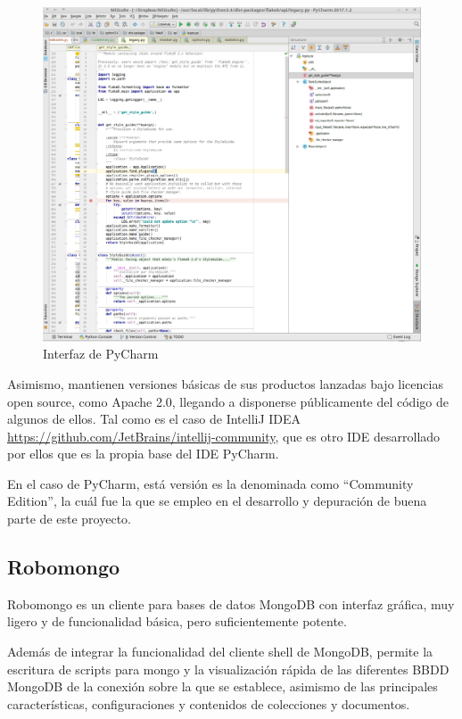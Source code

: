 \begin{figure}[H]
   \centering
   \includegraphics[width=16cm]{img/pycharm}
   \caption{Interfaz de PyCharm }
   \label{figura:pycharm}
\end{figure}



Asimismo, mantienen versiones básicas de sus productos lanzadas bajo licencias open source, como Apache 2.0, llegando a disponerse públicamente del código de algunos de ellos. Tal como es el caso de IntelliJ IDEA \space \url{https://github.com/JetBrains/intellij-community}, que es otro IDE desarrollado por ellos que es la propia base del IDE PyCharm.


En el caso de PyCharm, está versión es la denominada como ``Community Edition'', la cuál fue la que se empleo en el desarrollo y depuración de buena parte de este proyecto.




\subsection{Robomongo}
\label{subsec:robomongo}

Robomongo es un cliente para bases de datos MongoDB con interfaz gráfica, muy ligero y de funcionalidad básica, pero suficientemente potente.


Además de integrar la funcionalidad del cliente shell de MongoDB, permite la escritura de scripts para mongo y la visualización rápida de las diferentes BBDD MongoDB de la conexión sobre la que se establece, asimismo de las principales características, configuraciones y contenidos de colecciones y documentos.


